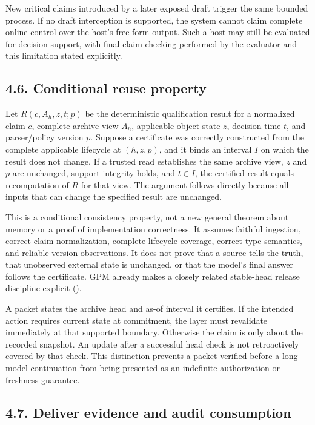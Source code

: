 \documentclass[
  11pt,
  a4paper,
]{article}
\begin{document}
New critical claims introduced by a later exposed draft trigger the same
bounded process. If no draft interception is supported, the system
cannot claim complete online control over the host's free-form output.
Such a host may still be evaluated for decision support, with final
claim checking performed by the evaluator and this limitation stated
explicitly.

\subsection{4.6. Conditional reuse
property}\label{conditional-reuse-property}

Let \(R(c,A_h,z,t;p)\) be the deterministic qualification result for a
normalized claim \(c\), complete archive view \(A_h\), applicable object
state \(z\), decision time \(t\), and parser/policy version \(p\).
Suppose a certificate was correctly constructed from the complete
applicable lifecycle at \((h,z,p)\), and it binds an interval \(I\) on
which the result does not change. If a trusted read establishes the same
archive view, \(z\) and \(p\) are unchanged, support integrity holds,
and \(t\in I\), the certified result equals recomputation of \(R\) for
that view. The argument follows directly because all inputs that can
change the specified result are unchanged.

This is a conditional consistency property, not a new general theorem
about memory or a proof of implementation correctness. It assumes
faithful ingestion, correct claim normalization, complete lifecycle
coverage, correct type semantics, and reliable version observations. It
does not prove that a source tells the truth, that unobserved external
state is unchanged, or that the model's final answer follows the
certificate. GPM already makes a closely related stable-head release
discipline explicit ().

A packet states the archive head and as-of interval it certifies. If the
intended action requires current state at commitment, the layer must
revalidate immediately at that supported boundary. Otherwise the claim
is only about the recorded snapshot. An update after a successful head
check is not retroactively covered by that check. This distinction
prevents a packet verified before a long model continuation from being
presented as an indefinite authorization or freshness guarantee.

\subsection{4.7. Deliver evidence and audit
consumption}\label{deliver-evidence-and-audit-consumption}
\end{document}
